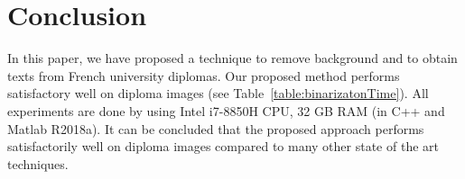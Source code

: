\documentclass[runningheads]{llncs}
\begin{document}

\section{Conclusion}
In this paper, we have proposed a technique to remove background and to obtain texts from French university diplomas. Our proposed method performs satisfactory well on diploma images (see Table~\ref{table:binarizatonTime}). All experiments are done by using Intel i7-8850H CPU, 32 GB RAM (in C++ and Matlab R2018a). It can be concluded that the proposed approach performs satisfactorily well on diploma images compared to many other state of the art techniques.     
\end{document}
